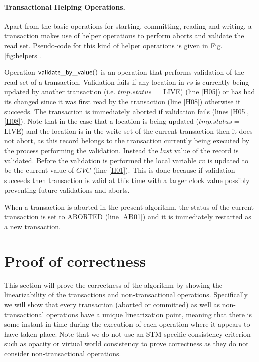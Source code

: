 \paragraph{Transactional Helping Operations.} 
Apart from the basic operations for starting, committing, 
reading and writing, a transaction makes use of helper 
operations to perform aborts and validate the read set.
 Pseudo-code for this kind of helper operations 
is given in Fig. \ref{fig:helpers}.

Operation ${\sf validate\_by\_value()}$ is an operation that performs 
validation of the read set of a transaction. 
Validation fails 
if any location in $\mathit{rs}$ is 
currently being updated by another transaction (i.e. $\mathit{tmp.status} = $ LIVE) (line \ref{H05})
or has had its changed since it was first read by the transaction (line \ref{H08})
otherwise it succeeds.
The transaction is immediately aborted if validation fails (lines \ref{H05}, \ref{H08}).
Note that in the case that a location is being updated ($\mathit{tmp.status} = $ LIVE) and the location
is in the write set of the current transaction then it does not abort, as this record belongs to the transaction
currently being executed by the process performing the validation.
Instead the $\mathit{last}$ value of the record is validated.
Before the validation is performed the local variable $\mathit{rv}$ is updated
to be the current value of $\mathit{GVC}$ (line \ref{H01}).
This is done because if validation succeeds then transaction is valid at this time
with a larger
clock value possibly preventing future validations and aborts.

When a transaction is aborted in the present algorithm, 
the status of the current transaction is set to ABORTED (line \ref{AB01}) and
it is immediately restarted as a new transaction.





\section{Proof of correctness}
This section will prove the correctness of the algorithm by showing the linearizability
of the transactions and non-transactional operations.
Specifically we will show that every transaction (aborted or committed) as well
as non-transactional operations have a unique linearization point, meaning that
there is some instant in time during the execution of each operation where it
appears to have taken place.
Note that we do not use an STM specific consistency criterion
such as opacity or virtual world consistency to prove correctness as they do not consider
non-transactional operations.

